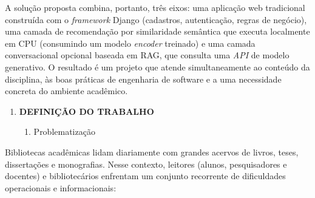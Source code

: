 \documentclass[
]{article}
\begin{document}
A solução proposta combina, portanto, três eixos: uma aplicação web
tradicional construída com o \emph{framework} Django (cadastros,
autenticação, regras de negócio), uma camada de recomendação por
similaridade semântica que executa localmente em CPU (consumindo um
modelo \emph{encoder} treinado) e uma camada conversacional opcional
baseada em RAG, que consulta uma \emph{API} de modelo generativo. O
resultado é um projeto que atende simultaneamente ao conteúdo da
disciplina, às boas práticas de engenharia de software e a uma
necessidade concreta do ambiente acadêmico.

\begin{enumerate}
\def\labelenumi{\arabic{enumi}.}
\setcounter{enumi}{2}
\item
  \protect{}\label{_Toc230227802}{}\textbf{DEFINIÇÃO DO
  TRABALHO}

  \begin{enumerate}
  \def\labelenumii{\arabic{enumii}.}
  \item
    \protect{}\label{_Toc230227803}{}Problematização
  \end{enumerate}
\end{enumerate}

Bibliotecas acadêmicas lidam diariamente com grandes acervos de livros,
teses, dissertações e monografias. Nesse contexto, leitores (alunos,
pesquisadores e docentes) e bibliotecários enfrentam um conjunto
recorrente de dificuldades operacionais e informacionais:
\end{document}

